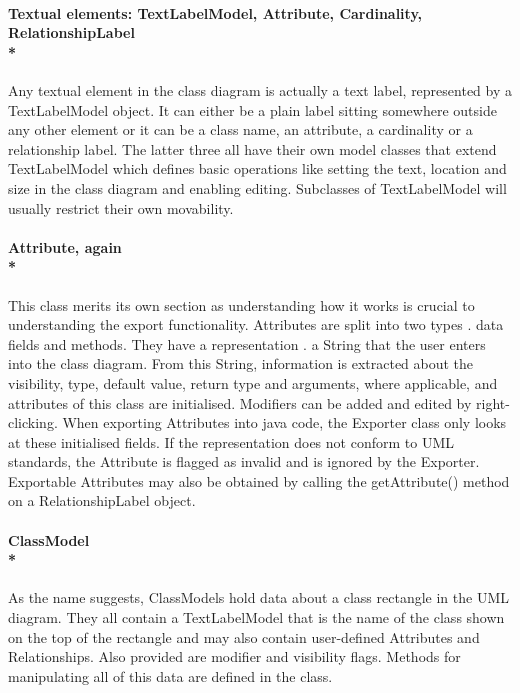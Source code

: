 \paragraph{\small{\tab Textual elements: TextLabelModel, Attribute, Cardinality, RelationshipLabel\\*}}

\hspace{-10pt}Any textual element in the class diagram is actually a text label, represented by a TextLabelModel object. It can either be a plain label sitting somewhere outside any other element or it can be a class name, an attribute, a cardinality or a relationship label. The latter three all have their own model classes that extend TextLabelModel which defines basic operations like setting the text, location and size in the class diagram and enabling editing. Subclasses of TextLabelModel will usually restrict their own movability.

\paragraph{\small{\tab Attribute, again\\*}}

\hspace{-10px}This class merits its own section as understanding how it works is crucial to understanding the export functionality. Attributes are split into two types . data fields and methods. They have a representation . a String that the user enters into the class diagram. From this String, information is extracted about the visibility, type, default value, return type and arguments, where applicable, and attributes of this class are initialised. Modifiers can be added and edited by right-clicking. When exporting Attributes into java code, the Exporter class only looks at these initialised fields. If the representation does not conform to UML standards, the Attribute is flagged as invalid and is ignored by the Exporter. Exportable Attributes may also be obtained by calling the getAttribute() method on a RelationshipLabel object.

\paragraph{\small{\tab ClassModel\\*}}

\hspace{-10px}As the name suggests, ClassModels hold data about a class rectangle in the UML diagram. They all contain a TextLabelModel that is the name of the class shown on the top of the rectangle and may also contain user-defined Attributes and Relationships. Also provided are modifier and visibility flags. Methods for manipulating all of this data are defined in the class.

